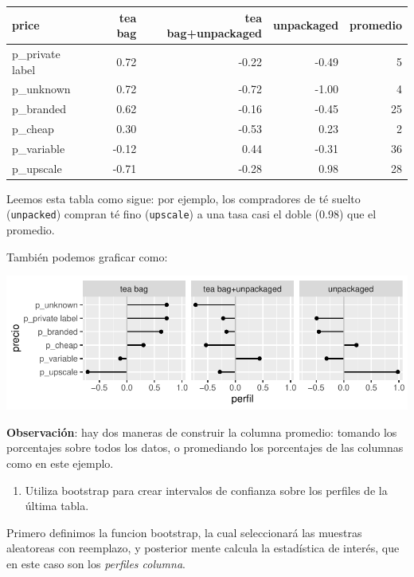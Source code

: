 \documentclass[]{article}
\providecommand{\tightlist}{%
  \setlength{\itemsep}{0pt}\setlength{\parskip}{0pt}}
\begin{document}
\begin{longtable}[]{@{}lrrrr@{}}
\toprule
price & tea bag & tea bag+unpackaged & unpackaged &
promedio\tabularnewline
\midrule
\endhead
p\_private label & 0.72 & -0.22 & -0.49 & 5\tabularnewline
p\_unknown & 0.72 & -0.72 & -1.00 & 4\tabularnewline
p\_branded & 0.62 & -0.16 & -0.45 & 25\tabularnewline
p\_cheap & 0.30 & -0.53 & 0.23 & 2\tabularnewline
p\_variable & -0.12 & 0.44 & -0.31 & 36\tabularnewline
p\_upscale & -0.71 & -0.28 & 0.98 & 28\tabularnewline
\bottomrule
\end{longtable}

Leemos esta tabla como sigue: por ejemplo, los compradores de té suelto
(\texttt{unpacked}) compran té fino (\texttt{upscale}) a una tasa casi
el doble (0.98) que el promedio.

También podemos graficar como:

\includegraphics{ExamenParcial_files/figure-latex/perfiles_grafica-1.pdf}

\textbf{Observación}: hay dos maneras de construir la columna promedio:
tomando los porcentajes sobre todos los datos, o promediando los
porcentajes de las columnas como en este ejemplo.

\begin{enumerate}
\def\labelenumi{\arabic{enumi}.}
\tightlist
\item
  Utiliza bootstrap para crear intervalos de confianza sobre los
  perfiles de la última tabla.
\end{enumerate}

Primero definimos la funcion bootstrap, la cual seleccionará las
muestras aleatoreas con reemplazo, y posterior mente calcula la
estadística de interés, que en este caso son los \emph{perfiles
columna}.
\end{document}
